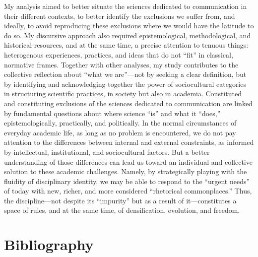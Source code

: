 \documentclass{tufte-handout}
\begin{document}
My analysis aimed to better situate the sciences dedicated to
communication in their different contexts, to better identify the
exclusions we suffer from, and ideally, to avoid reproducing these
exclusions where we would have the latitude to do so. My discursive
approach also required epistemological, methodological, and historical
resources, and at the same time, a precise attention to tenuous things:
heterogenous experiences, practices, and ideas that do not ``fit'' in
classical, normative frames. Together with other analyses, my study
contributes to the collective reflection about ``what we are''---not by
seeking a clear definition, but by identifying and acknowledging
together the power of sociocultural categories in structuring scientific
practices, in society but also in academia. Constituted and constituting
exclusions of the sciences dedicated to communication are linked by
fundamental questions about where science ``is'' and what it ``does,''
epistemologically, practically, and politically. In the normal
circumstances of everyday academic life, as long as no problem is
encountered, we do not pay attention to the differences between internal
and external constraints, as informed by intellectual, institutional,
and sociocultural factors. But a better understanding of those
differences can lead us toward an individual and collective solution to
these academic challenges. Namely, by strategically playing with the
fluidity of disciplinary identity, we may be able to respond to the
``urgent needs'' of today with new, richer, and more considered
``rhetorical commonplaces.'' Thus, the discipline---not despite its
``impurity'' but as a result of it---constitutes a space of rules, and
at the same time, of densification, evolution, and freedom.




\section{Bibliography}\label{bibliography}
\end{document}

